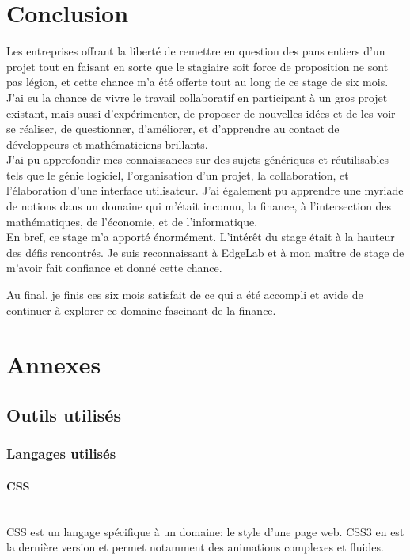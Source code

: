 \documentclass[a4paper,french,12pt]{article}
\begin{document}
\section{Conclusion}
	Les entreprises offrant la liberté de remettre en question des pans entiers d'un projet tout en faisant en sorte que le stagiaire soit force de proposition ne sont pas légion, et cette chance m'a été offerte tout au long de ce stage de six mois.
J'ai eu la chance de vivre le travail collaboratif en participant à un gros projet existant, mais aussi d'expérimenter, de proposer de nouvelles idées et de les voir se réaliser, de questionner, d'améliorer, et d'apprendre au contact de développeurs et mathématiciens brillants.~\\

	J'ai pu approfondir mes connaissances sur des sujets génériques et réutilisables tels que le génie logiciel, l'organisation d'un projet, la collaboration, et l'élaboration d'une interface utilisateur. J'ai également pu apprendre une myriade de notions dans un domaine qui m'était inconnu, la finance, à l'intersection des mathématiques, de l'économie, et de l'informatique.~\\
	
	En bref, ce stage m'a apporté énormément. L'intérêt du stage était à la hauteur des défis rencontrés.
	Je suis reconnaissant à EdgeLab et à mon maître de stage de m'avoir fait confiance et donné cette chance.

	Au final, je finis ces six mois satisfait de ce qui a été accompli et avide de continuer à explorer ce domaine fascinant de la finance.
	\newpage
\section{Annexes}

	\subsection{Outils utilisés}

		\subsubsection{Langages utilisés}
		
			\paragraph{CSS}~\\	
			CSS est un langage spécifique à un domaine: le style d'une page web. CSS3 en est la dernière version et permet notamment des animations complexes et fluides.
			
\end{document}
